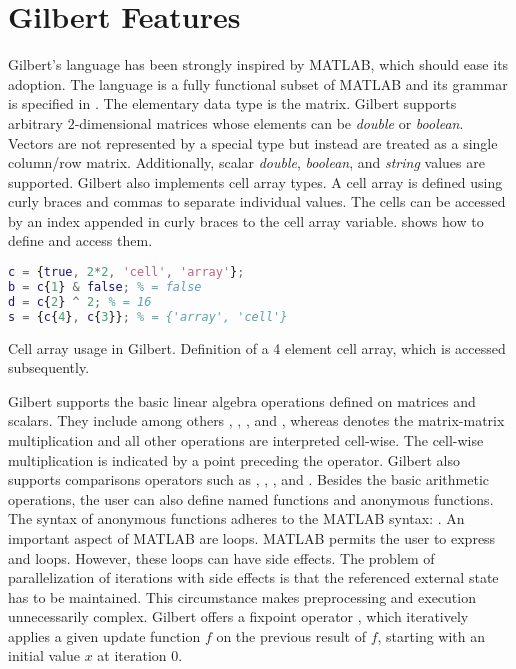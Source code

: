 \section{Gilbert Features}
\label{sec:gilbertFeatures}

Gilbert's language has been strongly inspired by MATLAB, which should ease its adoption.
The language is a fully functional subset of MATLAB and its grammar is specified in \cite{Rohrmann2014}.
The elementary data type is the matrix. Gilbert supports arbitrary $2$-dimensional matrices whose elements can be \emph{double} or \emph{boolean}.
Vectors are not represented by a special type but instead are treated as a single column/row matrix.
Additionally, scalar \emph{double}, \emph{boolean}, and \emph{string} values are supported. Gilbert also implements cell array types.
A cell array is defined using curly braces and commas to separate individual values. The cells can be accessed by an index appended in curly braces to the cell array variable.  shows how to define and access them.

\begin{listing}[!h]
    \begin{lstlisting}[language=Matlab,
        commentstyle=\color{black},
        stringstyle=\color{black},
        xleftmargin=.2\textwidth
    ]
c = {true, 2*2, 'cell', 'array'};
b = c{1} & false; % = false
d = c{2} ^ 2; % = 16
s = {c{4}, c{3}}; % = {'array', 'cell'} 
    \end{lstlisting}
  \caption{Cell array usage in Gilbert. Definition of a 4 element cell array, which is accessed subsequently.}
  \label{lst:cellArray}
\end{listing}

Gilbert supports the basic linear algebra operations defined on matrices and scalars. They include among others \code{+}, \code{-}, \code{/}, and \code{*}, whereas \code{*} denotes the matrix-matrix multiplication and all other operations are interpreted cell-wise. The cell-wise multiplication is indicated by a point preceding the operator. Gilbert also supports comparisons operators such as \code{>}, \code{>=}, \code{==}, and \code{\textasciitilde=}. Besides the basic arithmetic operations, the user can also define named functions and anonymous functions. The syntax of anonymous functions adheres to the MATLAB syntax: . An important aspect of MATLAB are loops. MATLAB permits the user to express  and  loops. However, these loops can have side effects. The problem of parallelization of iterations with side effects is that the referenced external state has to be maintained. This circumstance makes preprocessing and execution unnecessarily complex. Gilbert offers a fixpoint operator , which iteratively applies a given update function $f$ on the previous result of $f$, starting with an initial value $x$ at iteration $0$.

